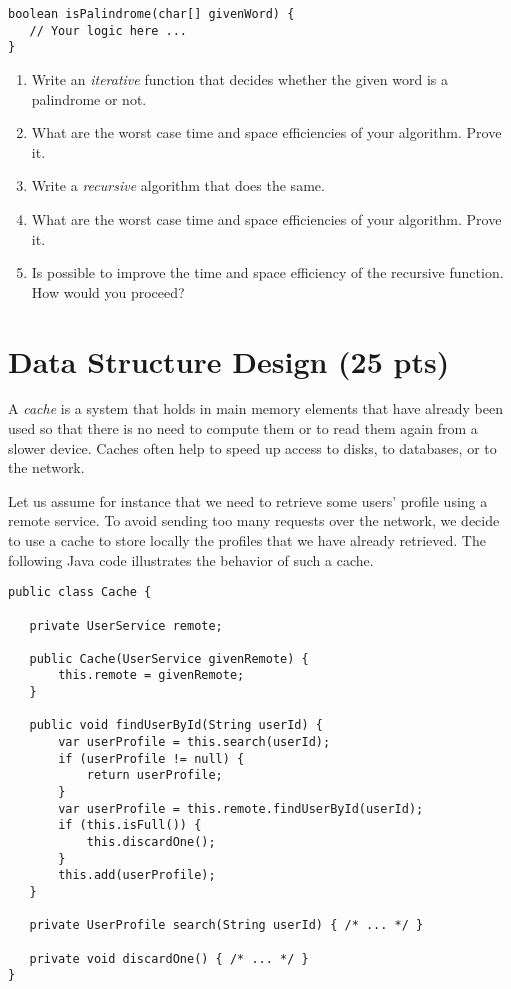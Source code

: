 \documentclass[11pt]{article}
\begin{document}
\begin{verbatim}
boolean isPalindrome(char[] givenWord) {
   // Your logic here ...
}
\end{verbatim}

\begin{enumerate}
\item Write an \emph{iterative} function that decides whether the given word is
a palindrome or not.

\item What are the worst case time and space efficiencies of your algorithm. Prove it.

\item Write a \emph{recursive} algorithm that does the same.

\item What are the worst case time and space efficiencies of your algorithm. Prove it.

\item Is possible to improve the time and space efficiency of the recursive
function. How would you proceed?
\end{enumerate}


\section{Data Structure Design (25 pts)}
\label{sec:org5de7f26}

A \emph{cache} is a system that holds in main memory elements that have
already been used so that there is no need to compute them or to
read them again from a slower device. Caches often help to speed
up access to disks, to databases, or to the network.

Let us assume for instance that we need to retrieve some users'
profile using a remote service. To avoid sending too many requests
over the network, we decide to use a cache to store locally the
profiles that we have already retrieved. The following Java code
illustrates the behavior of such a cache.

\begin{verbatim}
public class Cache {

   private UserService remote;

   public Cache(UserService givenRemote) {
       this.remote = givenRemote;
   }

   public void findUserById(String userId) {
       var userProfile = this.search(userId);
       if (userProfile != null) {
           return userProfile;
       }
       var userProfile = this.remote.findUserById(userId);
       if (this.isFull()) {
           this.discardOne();
       }
       this.add(userProfile);
   }

   private UserProfile search(String userId) { /* ... */ }

   private void discardOne() { /* ... */ }
}
\end{verbatim}
\end{document}
